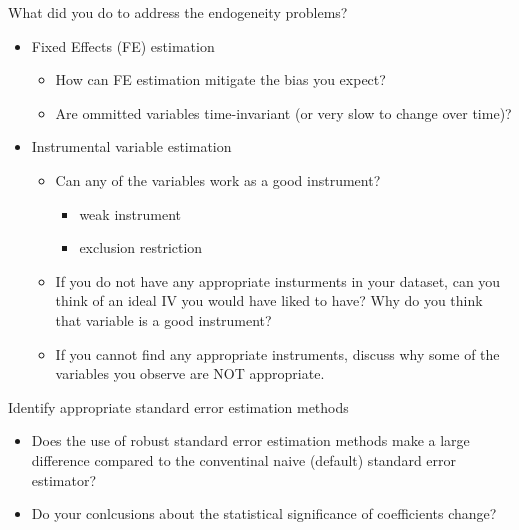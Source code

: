 \documentclass[fleqn]{beamer}\usepackage[]{graphicx}\usepackage[]{color}
\begin{document}
\begin{frame}[c]
  \begin{block}{What did you do to address the endogeneity problems?}  
    \begin{itemize}
      \item Fixed Effects (FE) estimation
        \begin{itemize}
          \item How can FE estimation mitigate the bias you expect?
          \item Are ommitted variables time-invariant (or very slow to change over time)?
        \end{itemize}
      \item Instrumental variable estimation
      \begin{itemize}
        \item Can any of the variables work as a good instrument? 
          \begin{itemize}
            \item weak instrument
            \item exclusion restriction
          \end{itemize}
        \item If you do not have any appropriate insturments in your dataset, can you think of an ideal IV you would have liked to have? Why do you think that variable is a good instrument?
        \item If you cannot find any appropriate instruments, discuss why some of the variables you observe are NOT appropriate.
      \end{itemize}
    \end{itemize} 
  \end{block}
\end{frame}

\begin{frame}[c]
\begin{block}{Identify appropriate standard error estimation methods}  
\begin{itemize}
  \item Does the use of robust standard error estimation methods make a large difference compared to the conventinal naive (default) standard error estimator?
  \item Do your conlcusions about the statistical significance of coefficients change?
\end{itemize}
\end{block}
\end{frame}
\end{document}
